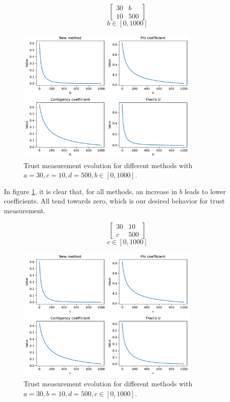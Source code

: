 $$
\begin{bmatrix}
    30 & b \\ 10 & 500
\end{bmatrix}
$$
$$
b \in [0, 1000]
$$
\begin{figure}[h!]
\centering
    \includegraphics[width=0.8\textwidth]{figures/chapter4/cell/trust_tests/2_a.pdf}
    \caption{Trust measurement evolution for different methods with $a=30, c=10, d=500, b \in [0, 1000]$.}
    \label{fig:trust_test_2_a}
\end{figure}
\FloatBarrier

In figure \ref{fig:trust_test_2_a}, it is clear that, for all methods, an increase in $b$ leads to lower coefficients. All tend towards zero, which is our desired behavior for trust measurement.

$$
\begin{bmatrix}
    30 & 10 \\ c & 500
\end{bmatrix}
$$
$$
c \in [0, 1000]
$$
\begin{figure}[h!]
\centering
    \includegraphics[width=0.8\textwidth]{figures/chapter4/cell/trust_tests/2_b.pdf}
    \caption{Trust measurement evolution for different methods with $a=30, b=10, d=500, c \in [0, 1000]$.}
    \label{fig:trust_test_2_b}
\end{figure}
\FloatBarrier

